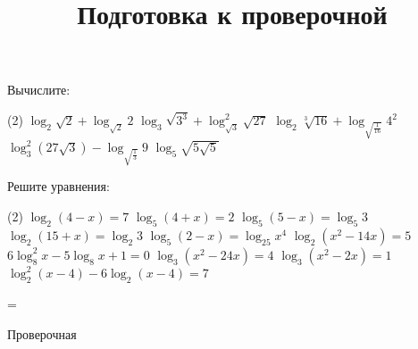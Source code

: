 \begin{class}[number=7]
	\title{Подготовка к проверочной}
	\begin{listofex}
		\item Вычислите:
		\begin{tasks}(2)
			\task \( \log_2 \sqrt{2} + \log_{\sqrt{2}}2 \)
			\task \( \log_3 \sqrt{3^3} + \log^2_{\sqrt{3}}\sqrt{27} \)
			\task \( \log_2 \sqrt[3]{16} + \log_{\sqrt{\frac{1}{16}}}4^{2} \)
			\task \( \log^2_3 (27\sqrt{3}) - \log_{\sqrt{\frac{1}{3}}}9 \)
			\task \( \log_5 \sqrt{5\sqrt{5}} \)
		\end{tasks}
		\item Решите уравнения: %
		\begin{tasks}(2)
			\task \( \log_2 (4-x)=7 \)
			\task \( \log_5(4+x)=2 \)
			\task \( \log_5(5-x)=\log_5 3 \)
			\task \( \log_2(15+x)=\log_2 3 \)
			\task \( \log_5 (2-x) = \log_{25} x^4 \)
			\task \( \log_2 (x^2-14x)=5 \)
			\task \( 6 \log^2_8 x -5\log_8 x+1=0 \)
			\task \( \log_3 (x^2-24x)=4 \)
			\task \( \log_3 (x^2-2x)=1 \)
			\task \( \log_2^2 (x-4) -6 \log_2 (x-4) = 7 \)
		\end{tasks}
		
		
	\end{listofex}
\end{class}

=%
\begin{exam}
	\begin{listofex}
		\item Проверочная
	\end{listofex}
\end{exam}
